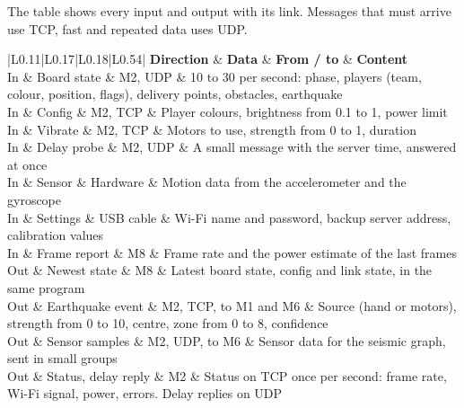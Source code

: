 \documentclass[
  english,
  10pt,
  a4paper,
]{article}
\newcommand{\ckkeep}[1]{\par\noindent\begin{minipage}{\linewidth}\setlength{\parskip}{4pt}#1\end{minipage}\par\smallskip}
\begin{document}
\ckkeep{%
The table shows every input and output with its link. Messages that must arrive use TCP, fast and
repeated data uses UDP.

\begin{tabular}{|L{0.11}|L{0.17}|L{0.18}|L{0.54}|}
\hline \textbf{Direction} & \textbf{Data} & \textbf{From / to} & \textbf{Content} \\ \hline 
In & Board state & M2, UDP & 10 to 30 per second: phase, players (team, colour, position, flags), delivery points, obstacles, earthquake \\ \hline
In & Config & M2, TCP & Player colours, brightness from 0.1 to 1, power limit \\ \hline
In & Vibrate & M2, TCP & Motors to use, strength from 0 to 1, duration \\ \hline
In & Delay probe & M2, UDP & A small message with the server time, answered at once \\ \hline
In & Sensor & Hardware & Motion data from the accelerometer and the gyroscope \\ \hline
In & Settings & USB cable & Wi-Fi name and password, backup server address, calibration values \\ \hline
In & Frame report & M8 & Frame rate and the power estimate of the last frames \\ \hline
Out & Newest state & M8 & Latest board state, config and link state, in the same program \\ \hline
Out & Earthquake event & M2, TCP, to M1 and M6 & Source (hand or motors), strength from 0 to 10, centre, zone from 0 to 8, confidence \\ \hline
Out & Sensor samples & M2, UDP, to M6 & Sensor data for the seismic graph, sent in small groups \\ \hline
Out & Status, delay reply & M2 & Status on TCP once per second: frame rate, Wi-Fi signal, power, errors. Delay replies on UDP \\ \hline
\end{tabular}}

\end{document}
